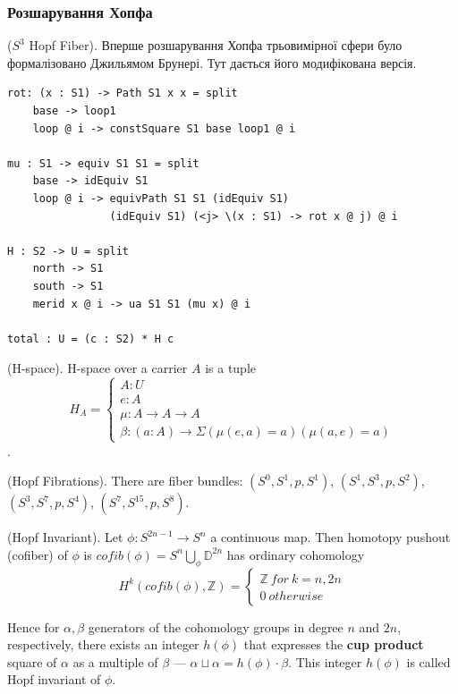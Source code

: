 \subsubsection{Розшарування Хопфа}
\begin{example} ($S^3$ Hopf Fiber).
Вперше розшарування Хопфа трьовимірної сфери було формалізовано Джильямом Брунері.
Тут дається його модифікована версія.
\begin{lstlisting}
rot: (x : S1) -> Path S1 x x = split
    base -> loop1
    loop @ i -> constSquare S1 base loop1 @ i

mu : S1 -> equiv S1 S1 = split
    base -> idEquiv S1
    loop @ i -> equivPath S1 S1 (idEquiv S1)
                (idEquiv S1) (<j> \(x : S1) -> rot x @ j) @ i

H : S2 -> U = split
    north -> S1
    south -> S1
    merid x @ i -> ua S1 S1 (mu x) @ i

total : U = (c : S2) * H c
\end{lstlisting}
\end{example}

\begin{definition} (H-space).
H-space over a carrier $A$ is a tuple
$$
H_A=
\begin{cases}
A : U\\
e : A\\
\mu : A \rightarrow A \rightarrow A\\
\beta : (a:A) \rightarrow \Sigma (\mu(e,a)=a) (\mu(a,e)=a)
\end{cases}
$$.
\end{definition}

\begin{theorem} (Hopf Fibrations).
There are fiber bundles: 
$(S^0,S^1,p,S^1)$,
$(S^1,S^3,p,S^2)$,
$(S^3,S^7,p,S^4)$,
$(S^7,S^{15},p,S^8)$.
\end{theorem}

\begin{definition} (Hopf Invariant).
Let $\phi: S^{2n-1} \rightarrow S^{n}$ a continuous map.
Then homotopy pushout (cofiber) of $\phi$ is
$cofib(\phi) = S^{n} \bigcup_\phi \mathbb{D}^{2n}$ has
ordinary cohomology
$$
H^{k}(cofib(\phi),\mathbb{Z})=
\begin{cases}
\mathbb{Z}\ for\ k=n,2n \\[2ex]
0\ otherwise
\end{cases}
$$
\end{definition}

Hence for $\alpha,\beta$ generators of the cohomology groups in
degree $n$ and $2n$, respectively, there exists an integer $h(\phi)$
that expresses the {\bf cup product} square of $\alpha$
as a multiple of $\beta$ --- $\alpha\sqcup\alpha=h(\phi)\cdot\beta$.
This integer $h(\phi)$ is called Hopf invariant of $\phi$.

